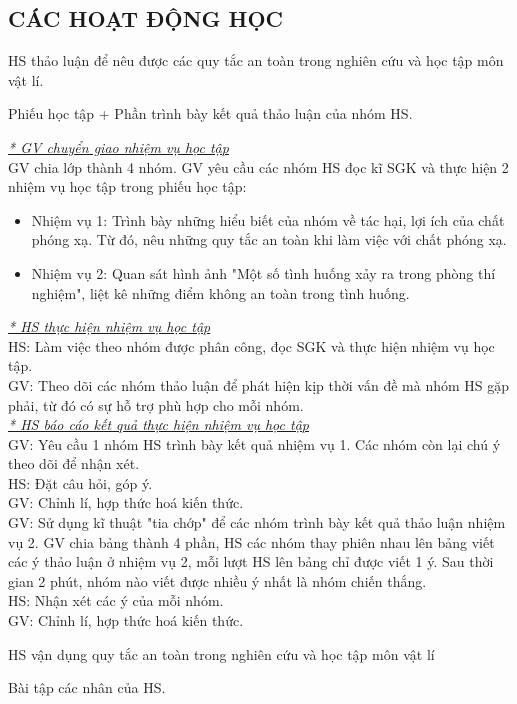 \subsection{CÁC HOẠT ĐỘNG HỌC}
{
HS thảo luận để nêu được các quy tắc an toàn trong nghiên cứu và học tập môn vật lí.
}
{Phiếu học tập + Phần trình bày kết quả thảo luận của nhóm HS.

}
{\textit{\underline{* GV chuyển giao nhiệm vụ học tập}}\\
	GV chia lớp thành 4 nhóm. GV yêu cầu các nhóm HS đọc kĩ SGK và thực hiện 2 nhiệm vụ học tập trong phiếu học tập:
	\begin{itemize}
		\item Nhiệm vụ 1: Trình bày những hiểu biết của nhóm về tác hại, lợi ích của chất phóng xạ. Từ đó, nêu những quy tắc an toàn khi làm việc với chất phóng xạ.
		\item Nhiệm vụ 2: Quan sát hình ảnh "Một số tình huống xảy ra trong phòng thí nghiệm", liệt kê những điểm không an toàn trong tình huống.
	\end{itemize}
\textit{\underline{* HS thực hiện nhiệm vụ học tập}}\\
HS: Làm việc theo nhóm được phân công, đọc SGK và thực hiện nhiệm vụ học tập.\\
GV: Theo dõi các nhóm thảo luận để phát hiện kịp thời vấn đề mà nhóm HS gặp phải, từ đó có sự hỗ trợ phù hợp cho mỗi nhóm.\\
\textit{\underline{* HS báo cáo kết quả thực hiện nhiệm vụ học tập}}\\
GV: Yêu cầu 1 nhóm HS trình bày kết quả nhiệm vụ 1. Các nhóm còn lại chú ý theo dõi để nhận xét.\\
HS: Đặt câu hỏi, góp ý.\\
GV: Chỉnh lí, hợp thức hoá kiến thức.\\
GV: Sử dụng kĩ thuật "tia chớp" để các nhóm trình bày kết quả thảo luận nhiệm vụ 2. GV chia bảng thành 4 phần, HS các nhóm thay phiên nhau lên bảng viết các ý thảo luận ở nhiệm vụ 2, mỗi lượt HS lên bảng chỉ được viết 1 ý. Sau thời gian 2 phút, nhóm nào viết được nhiều ý nhất là nhóm chiến thắng.\\
HS: Nhận xét các ý của mỗi nhóm.\\
GV: Chỉnh lí, hợp thức hoá kiến thức.
}
{
HS vận dụng quy tắc an toàn trong nghiên cứu và học tập môn vật lí
}
{Bài tập các nhân của HS.

}
